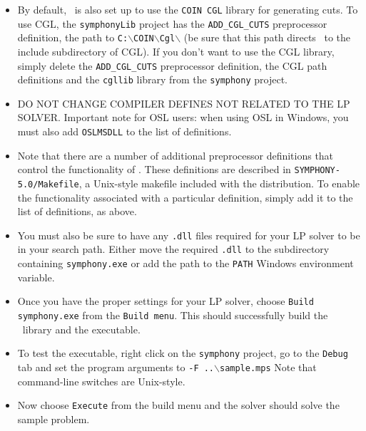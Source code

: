 \begin{itemize}
\begin{itemize}
\end{itemize}

\item By default, \BB\ is also set up to use the \texttt{COIN CGL} library for
generating cuts. To use CGL, the \texttt{symphonyLib} project has the
\texttt{ADD\_CGL\_CUTS} preprocessor definition, the path to
\texttt{C:$\backslash$COIN$\backslash$Cgl$\backslash$} (be sure that this path
directs \BB\ to the include subdirectory of CGL). If you don't want to use the 
CGL library, simply
delete the \texttt{ADD\_CGL\_CUTS} preprocessor definition, the CGL path
definitions and the \texttt{cgllib} library from the \texttt{symphony}
project.

\item DO NOT CHANGE COMPILER DEFINES NOT RELATED TO THE LP SOLVER. Important 
note for OSL users: when using OSL in Windows, you must also add 
\texttt{OSLMSDLL} to the list of definitions.

\item Note that there are a number of additional preprocessor definitions that
control the functionality of \BB. These definitions are described in
\texttt{SYMPHONY-5.0/Makefile}, a Unix-style makefile included with the
distribution. To enable the functionality associated with a particular
definition, simply add it to the list of definitions, as above.

\item You must also be sure to have any \texttt{.dll} files required for your
LP solver to be in your search path. Either move the required \texttt{.dll} to
the subdirectory containing \texttt{symphony.exe} or add the path to the 
\texttt{PATH} Windows environment variable.

\item Once you have the proper settings for your LP solver, choose 
\texttt{Build symphony.exe} from the \texttt{Build menu}. This should 
successfully build the \BB\ library and the executable.

\item To test the executable, right click on the \texttt{symphony} project, go
to the \texttt{Debug} tab and set the program arguments to \texttt{-F
..$\backslash${sample.mps}} Note that command-line switches are Unix-style.

\item Now choose \texttt{Execute} from the build menu and the solver
should solve the sample problem.

\end{itemize}

